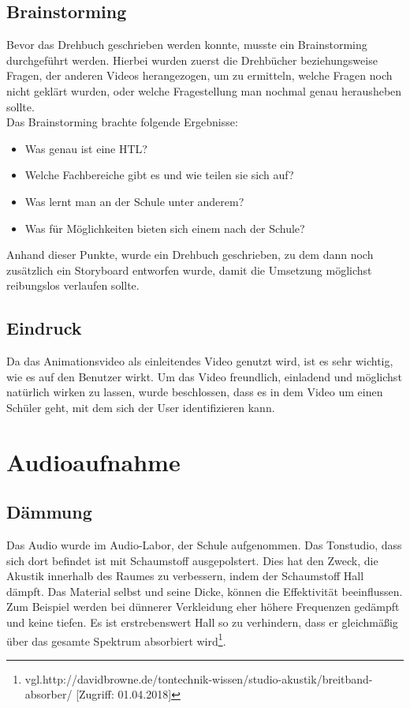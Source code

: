 \subsection{Brainstorming}
Bevor das Drehbuch geschrieben werden konnte, musste ein Brainstorming durchgeführt werden. Hierbei wurden zuerst die Drehbücher beziehungsweise Fragen, der anderen Videos herangezogen, um zu ermitteln, welche Fragen noch nicht geklärt wurden, oder welche Fragestellung man nochmal genau herausheben sollte.
\leavevmode \\
Das Brainstorming brachte folgende Ergebnisse:
\begin{itemize}
\item Was genau ist eine HTL?
\item Welche Fachbereiche gibt es und wie teilen sie sich auf?
\item Was lernt man an der Schule unter anderem?
\item Was für Möglichkeiten bieten sich einem nach der Schule?
\end{itemize}
Anhand dieser Punkte, wurde ein Drehbuch geschrieben, zu dem dann noch zusätzlich ein Storyboard entworfen wurde, damit die Umsetzung möglichst reibungslos verlaufen sollte.
\subsection{Eindruck}
Da das Animationsvideo als einleitendes Video genutzt wird, ist es sehr wichtig, wie es auf den Benutzer wirkt. Um das Video freundlich, einladend und möglichst natürlich wirken zu lassen, wurde beschlossen, dass es in dem Video um einen Schüler geht, mit dem sich der User identifizieren kann.
\section{Audioaufnahme}
\subsection{Dämmung}
Das Audio wurde im Audio-Labor, der Schule aufgenommen. Das Tonstudio, dass sich dort befindet ist mit Schaumstoff ausgepolstert. Dies hat den Zweck, die Akustik innerhalb des Raumes zu verbessern, indem der Schaumstoff Hall dämpft. Das Material selbst und seine Dicke, können die Effektivität beeinflussen. Zum Beispiel werden bei dünnerer Verkleidung eher höhere Frequenzen gedämpft und keine tiefen. Es ist erstrebenswert Hall so zu verhindern, dass er gleichmäßig über das gesamte Spektrum absorbiert wird\footnote{\label{} vgl.http://davidbrowne.de/tontechnik-wissen/studio-akustik/breitband-absorber/ [Zugriff: 01.04.2018]}. 
